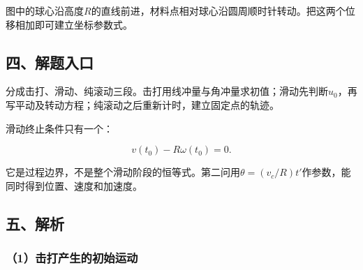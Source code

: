 \documentclass[12pt,a4paper,fontset=fandol]{ctexart}
\begin{document}
\begin{center}
\begin{minipage}{\linewidth}
\centering\begingroup{}
\ifdim\wd\diagrambox>.88\linewidth
\sbox{\diagrambox}{\resizebox{.88\linewidth}{!}{\usebox{\diagrambox}}}\fi
\ifdim\ht\diagrambox>.38\textheight
\resizebox{!}{.38\textheight}{\usebox{\diagrambox}}
\else\usebox{\diagrambox}\fi
\par{}\endgroup\end{minipage}\end{center}

图中的球心沿高度\(R\)的直线前进，材料点相对球心沿圆周顺时针转动。把这两个位移相加即可建立坐标参数式。

\subsection{四、解题入口}\label{ux56dbux89e3ux9898ux5165ux53e3-1}

分成击打、滑动、纯滚动三段。击打用线冲量与角冲量求初值；滑动先判断\(u_0\)，再写平动及转动方程；纯滚动之后重新计时，建立固定点的轨迹。

滑动终止条件只有一个：

\[
v(t_0)-R\omega(t_0)=0.
\]

它是过程边界，不是整个滑动阶段的恒等式。第二问用\(\theta=(v_c/R)t'\)作参数，能同时得到位置、速度和加速度。

\subsection{五、解析}\label{ux4e94ux89e3ux6790-1}

\subsubsection{（1）击打产生的初始运动}\label{ux51fbux6253ux4ea7ux751fux7684ux521dux59cbux8fd0ux52a8}
\end{document}
